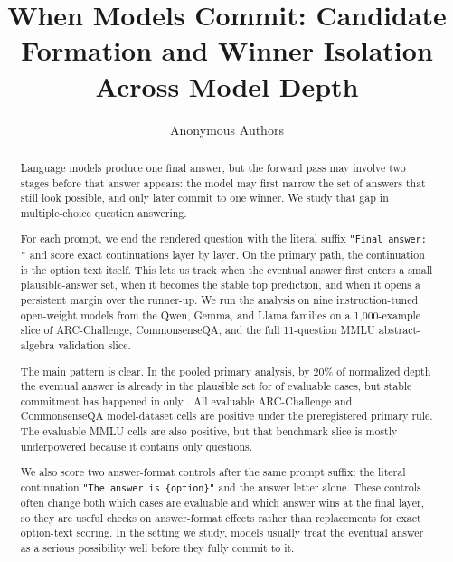 \documentclass{article}
\title{When Models Commit: Candidate Formation and Winner Isolation Across Model Depth}
\author{Anonymous Authors}
\begin{document}
\ifcolmsubmission
\linenumbers
\fi

\maketitle

\begin{abstract}
Language models produce one final answer, but the forward pass may involve two stages before that answer appears: the model may first narrow the set of answers that still look possible, and only later commit to one winner. We study that gap in multiple-choice question answering.

For each prompt, we end the rendered question with the literal suffix \texttt{"Final answer: "} and score exact continuations layer by layer. On the primary path, the continuation is the option text itself. This lets us track when the eventual answer first enters a small plausible-answer set, when it becomes the stable top prediction, and when it opens a persistent margin over the runner-up. We run the analysis on nine instruction-tuned open-weight models from the Qwen, Gemma, and Llama families on a 1{,}000-example slice of ARC-Challenge, CommonsenseQA, and the full 11-question MMLU abstract-algebra validation slice.

The main pattern is clear. In the pooled primary analysis, by 20\% of normalized depth the eventual answer is already in the plausible set for \FlagshipTwentyPlausiblePct{} of evaluable cases, but stable commitment has happened in only \FlagshipTwentyCommittedPct{}. All \ArcCsqaPositiveCells{} evaluable ARC-Challenge and CommonsenseQA model-dataset cells are positive under the preregistered primary rule. The \MmluPositiveCells{} evaluable MMLU cells are also positive, but that benchmark slice is mostly underpowered because it contains only \MmluPromptCount{} questions.

We also score two answer-format controls after the same prompt suffix: the literal continuation \texttt{"The answer is \{option\}"} and the answer letter alone. These controls often change both which cases are evaluable and which answer wins at the final layer, so they are useful checks on answer-format effects rather than replacements for exact option-text scoring. In the setting we study, models usually treat the eventual answer as a serious possibility well before they fully commit to it.
\end{abstract}











\onecolumn
\appendix

\end{document}
